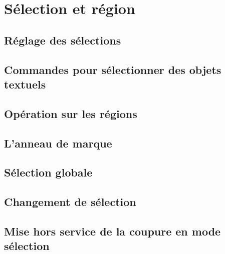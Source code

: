 \chapter{Sélection et région}\label{chap8}
\section{Réglage des sélections}\label{chap8sec1}
\section{Commandes pour sélectionner des objets
  textuels}\label{chap8sec2} 
\section{Opération sur les régions}\label{chap8sec3}
\section{L'anneau de marque}\label{chap8sec4}
\section{Sélection globale}\label{chap8sec5}
\section{Changement de sélection}\label{chap8sec6}
\section{Mise hors service de la coupure en mode
  sélection}\label{chap8sec7} 
